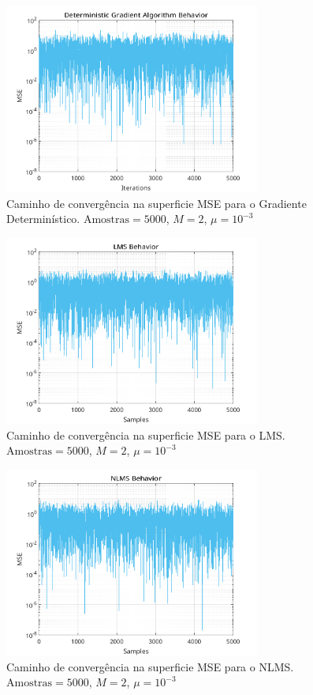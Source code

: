 \documentclass[a4paper,10pt]{article}
\begin{document}
\begin{enumerate}
				\begin{figure}[!ht]
					\centering
					\includegraphics[width=0.75\textwidth]{figs/gradient_mse.png}
					\caption{Caminho de convergência na superficie MSE para o Gradiente Determinístico. $\text{Amostras} = 5000$, $M = 2$, $\mu = 10^{-3}$}
					\label{fig:gradient_mse}
				\end{figure}

				\begin{figure}[!ht]
					\centering
					\includegraphics[width=0.75\textwidth]{figs/lms_mse.png}
					\caption{Caminho de convergência na superficie MSE para o LMS. $\text{Amostras}  = 5000$, $M = 2$, $\mu = 10^{-3}$}
					\label{fig:lms_mse}
				\end{figure}

				\begin{figure}[!ht]
					\centering
					\includegraphics[width=0.75\textwidth]{figs/nlms_mse.png}
					\caption{Caminho de convergência na superficie MSE para o NLMS. $\text{Amostras} = 5000$, $M = 2$, $\mu = 10^{-3}$}
					\label{fig:nlms_mse}
				\end{figure}


\end{enumerate}
\end{document}
